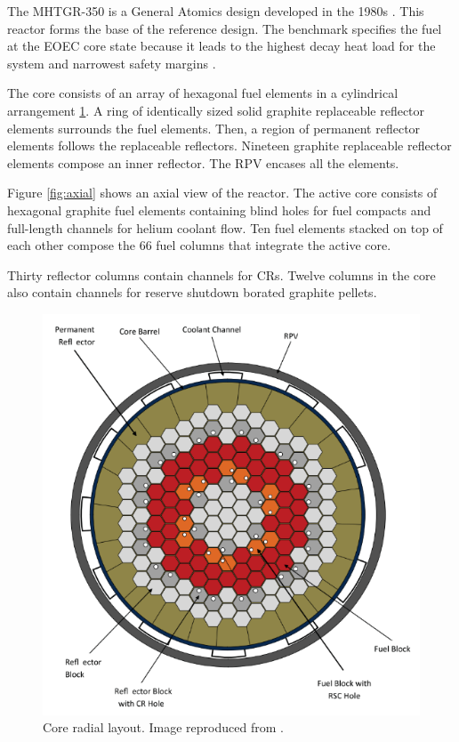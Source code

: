 \documentclass{anstrans}
\begin{document}
The MHTGR-350 is a General Atomics design developed in the 1980s \cite{silady_licensing_1988}.
This reactor forms the base of the reference design.
The benchmark specifies the fuel at the \gls{EOEC} core state because it leads to the highest decay heat load for the system and narrowest safety margins \cite{oecd_nea_benchmark_2017}.

The core consists of an array of hexagonal fuel elements in a cylindrical arrangement \ref{fig:radial}.
A ring of identically sized solid graphite replaceable reflector elements surrounds the fuel elements.
Then, a region of permanent reflector elements follows the replaceable reflectors.
Nineteen graphite replaceable reflector elements compose an inner reflector.
The RPV encases all the elements.

Figure \ref{fig:axial} shows an axial view of the reactor.
The active core consists of hexagonal graphite fuel elements containing blind holes for fuel compacts and full-length channels for helium coolant flow.
Ten fuel elements stacked on top of each other compose the 66 fuel columns that integrate the active core.

Thirty reflector columns contain channels for \glspl{CR}.
Twelve columns in the core also contain channels for reserve shutdown borated graphite pellets.

\begin{figure}[htbp!] %
	\centering
	\includegraphics[width=0.95\linewidth]{figures/radial-layout.png}
	\hfill
	\caption{Core radial layout. Image reproduced from \cite{oecd_nea_benchmark_2017}.}
	\label{fig:radial}
\end{figure}
\end{document}
